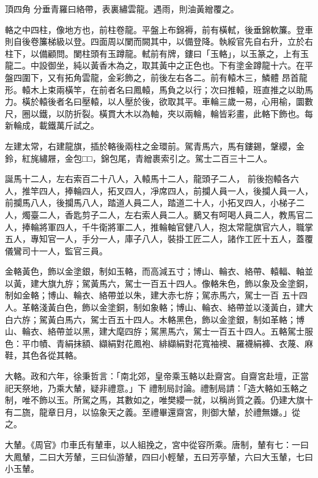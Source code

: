 \begin{pinyinscope}
 頂四角
 分垂青羅曰絡帶，表裏繡雲龍。遇雨，則油黃繒覆之。



 輅之中四柱，像地方也，前柱卷龍。平盤上布錦褥，前有橫軾，後垂錦軟簾。登車則自後卷簾梯級以登。四面周以闌而闕其中，以備登降。執綏官先自右升，立於右柱下，以備顧問。闌柱頭有玉蹲龍。軾前有牌，鏤曰「玉輅」，以玉篆之，上有玉龍二。中設御坐，純以黃香木為之，取其黃中之正色也。下有塗金蹲龍十六。在平盤四圍下，又有拓角雲龍，金彩飾之，前後左右各二。前有轅木三，鱗體
 昂首龍形。轅木上束兩橫竿，在前者名曰鳳轅，馬負之以行；次曰推轅，班直推之以助馬力。橫於轅後者名曰壓轅，以人壓於後，欲取其平。車輪三歲一易，心用榆，圜數尺，圈以鐵，以防折裂。橫貫大木以為軸，夾以兩輪，輪皆彩畫，此輅下飾也。每新輪成，載鐵萬斤試之。



 左建太常，右建龍旗，插於輅後兩柱之金環前。駕青馬六，馬有鏤錫，鞶纓，金鈴，紅旄繡屜，金包□□，錦包尾，青繒裹索引之。駕士二百三十二人。



 誕馬十二人，左右索百二十八人，入轅馬十二人，龍頭子二人，
 前後抱轅各六人，推竿四人，捧輪四人，拓叉四人，凈席四人，前攔人員一人，後攔人員一人，前攔馬八人，後攔馬八人，踏道人員二人，踏道二十人，小拓叉四人，小梯子二人，燭臺二人，香匙剪子二人，左右索人員二人。鵩又有呵喝人員二人，教馬官二人，捧輪將軍四人，千牛衛將軍二人，推輪軸官健八人，抱太常龍旗官六人，職掌五人，專知官一人，手分一人，庫子八人，裝掛工匠二人，諸作工匠十五人，蓋覆儀鸞司十一人，監官三員。



 金輅黃色，飾以金塗銀，制如玉輅，而高減五寸；博山、輪衣、絡帶、轅輻、軸並以黃，建大旗九斿；駕黃馬六，駕士一百五十四人。像輅朱色，飾以象及金塗銅，制如金輅；博山、輪衣、絡帶並以朱，建大赤七斿；駕赤馬六，駕士一百
 五十四人。革輅淺黃白色，飾以金塗銅，制如象輅；博山、輪衣、絡帶並以淺黃白，建大白六斿；駕黃白馬六，駕士百五十四人。木輅黑色，飾以金塗銀，制如革輅；博山、輪衣、絡帶並以黑，建大麾四斿；駕黑馬六，駕士一百五十四人。五輅駕士服色：平巾幘、青絹抹額、纈絹對花鳳袍、緋纈絹對花寬袖襖、羅襪絹褲、衣蔑、麻鞋，其色各從其輅。



 大輅。政和六年，徐秉哲言：「南北郊，皇帝乘玉輅以赴齋宮。自齋宮赴壇，正當祀天祭地，乃乘大輦，疑非禮意。」下
 禮制局討論。禮制局請：「造大輅如玉輅之制，唯不飾以玉。所駕之馬，其數如之，唯樊纓一就，以稱尚質之義。仍建大旗十有二旒，龍章日月，以協象天之義。至禮畢還齋宮，則御大輦，於禮無嫌。」從之。



 大輦。《周官》巾車氏有輦車，以人組挽之，宮中從容所乘。唐制，輦有七：一曰大鳳輦，二曰大芳輦，三曰仙游輦，四曰小輕輦，五曰芳亭輦，六曰大玉輦，七曰小玉輦。




\end{pinyinscope}
